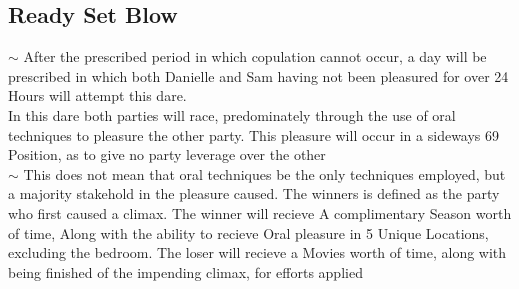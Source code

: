 \subsection{Ready Set Blow}
\indent $\sim$ After the prescribed period in which copulation cannot occur, a day will be prescribed in which both 
	Danielle and Sam having not been pleasured for over 24 Hours will attempt this dare. \\
	In this dare both parties will race, predominately through the use of oral techniques to pleasure the other party. 
	This pleasure will occur in a sideways 69 Position, as to give no party leverage over the other \\
	\indent $\sim$ \hspace{5mm} This does not mean that oral techniques be the only techniques employed, but a majority stakehold
	in the pleasure caused.
	The winners is defined as the party who first caused a climax. The winner will recieve A complimentary Season worth of time,
	Along with the ability to recieve Oral pleasure in 5 Unique Locations, excluding the bedroom.
	The loser will recieve a Movies worth of time, along with being finished of the impending climax, for efforts applied